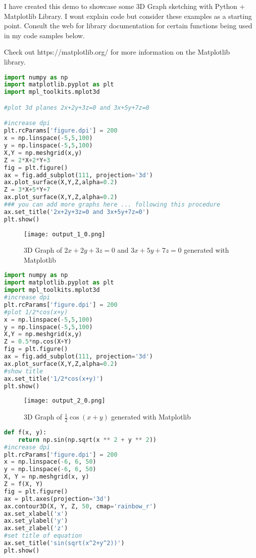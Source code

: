 I have created this demo to showcase some 3D Graph sketching with Python + Matplotlib Library. I wont explain code but consider these examples as a starting point.
Consult the web for library documentation for certain functions being used in my code samples below.

Check out https://matplotlib.org/ for more information on the Matplotlib library.

\begin{lstlisting}[language=Python]
import numpy as np 
import matplotlib.pyplot as plt 
import mpl_toolkits.mplot3d

#plot 3d planes 2x+2y+3z=0 and 3x+5y+7z=0

#increase dpi
plt.rcParams['figure.dpi'] = 200
x = np.linspace(-5,5,100)
y = np.linspace(-5,5,100)
X,Y = np.meshgrid(x,y)
Z = 2*X+2*Y+3
fig = plt.figure()
ax = fig.add_subplot(111, projection='3d')
ax.plot_surface(X,Y,Z,alpha=0.2)
Z = 3*X+5*Y+7
ax.plot_surface(X,Y,Z,alpha=0.2)
### you can add more graphs here ... following this procedure
ax.set_title('2x+2y+3z=0 and 3x+5y+7z=0')
plt.show()
\end{lstlisting}

\begin{figure}[H]
\centering
\texttt{[image: output\_1\_0.png]}
\caption{3D Graph of $2x+2y+3z=0$ and $3x+5y+7z=0$ generated with Matplotlib}
\label{fig:line3d}
\end{figure}

\begin{lstlisting}[language=Python]
import numpy as np 
import matplotlib.pyplot as plt 
import mpl_toolkits.mplot3d
#increase dpi
plt.rcParams['figure.dpi'] = 200
#plot 1/2*cos(x+y)
x = np.linspace(-5,5,100)
y = np.linspace(-5,5,100)
X,Y = np.meshgrid(x,y)
Z = 0.5*np.cos(X+Y)
fig = plt.figure()
ax = fig.add_subplot(111, projection='3d')
ax.plot_surface(X,Y,Z,alpha=0.2)
#show title
ax.set_title('1/2*cos(x+y)')
plt.show()
\end{lstlisting}    

\begin{figure}[H]
\centering
\texttt{[image: output\_2\_0.png]}
\caption{3D Graph of $\frac{1}{2}\cos(x+y)$ generated with Matplotlib}
\end{figure}

\begin{lstlisting}[language=Python]
def f(x, y):
    return np.sin(np.sqrt(x ** 2 + y ** 2))
#increase dpi
plt.rcParams['figure.dpi'] = 200
x = np.linspace(-6, 6, 50)
y = np.linspace(-6, 6, 50)
X, Y = np.meshgrid(x, y)
Z = f(X, Y)
fig = plt.figure()
ax = plt.axes(projection='3d')
ax.contour3D(X, Y, Z, 50, cmap='rainbow_r')
ax.set_xlabel('x')
ax.set_ylabel('y')
ax.set_zlabel('z')
#set title of equation
ax.set_title('sin(sqrt(x^2+y^2))')
plt.show()
\end{lstlisting}

